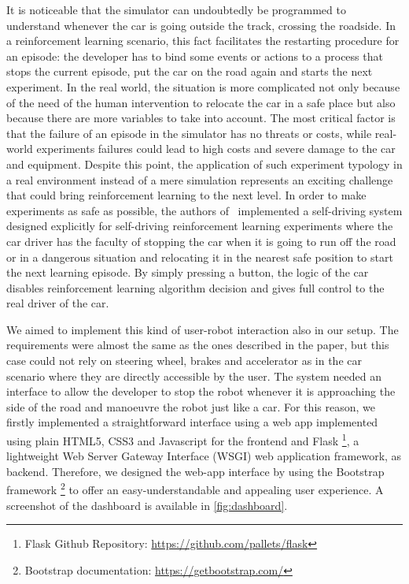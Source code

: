 It is noticeable that the simulator can undoubtedly be programmed to understand whenever the car is going outside the track, crossing the roadside.
In a reinforcement learning scenario, this fact facilitates the restarting procedure for an episode: the developer has to bind some events or actions to a process that stops the current episode, put the car on the road again and starts the next experiment.
In the real world, the situation is more complicated not only because of the need of the human intervention to relocate the car in a safe place but also because there are more variables to take into account.
The most critical factor is that the failure of an episode in the simulator has no threats or costs, while real-world experiments failures could lead to high costs and severe damage to the car and equipment.
Despite this point, the application of such experiment typology in a real environment instead of a mere simulation represents an exciting challenge that could bring reinforcement learning to the next level.
In order to make experiments as safe as possible, the authors of~\cite{kendall2018learning,kendall2019learning} implemented a self-driving system designed explicitly for self-driving reinforcement learning experiments where the car driver has the faculty of stopping the car when it is going to run off the road or in a dangerous situation and relocating it in the nearest safe position to start the next learning episode.
By simply pressing a button, the logic of the car disables reinforcement learning algorithm decision and gives full control to the real driver of the car.

We aimed to implement this kind of user-robot interaction also in our setup.
The requirements were almost the same as the ones described in the paper, but this case could not rely on steering wheel, brakes and accelerator as in the car scenario where they are directly accessible by the user.
The system needed an interface to allow the developer to stop the robot whenever it is approaching the side of the road and manoeuvre the robot just like a car.
For this reason, we firstly implemented a straightforward interface using a web app implemented using plain HTML5, CSS3 and Javascript for the frontend and Flask \footnote{Flask Github Repository: \href{https://github.com/pallets/flask}{https://github.com/pallets/flask}}, a lightweight Web Server Gateway Interface (WSGI) web application framework, as backend.
Therefore, we designed the web-app interface by using the Bootstrap framework \footnote{Bootstrap documentation: \href{https://getbootstrap.com/}{https://getbootstrap.com/}} to offer an easy-understandable and appealing user experience. A screenshot of the dashboard is available in \vref{fig:dashboard}.

